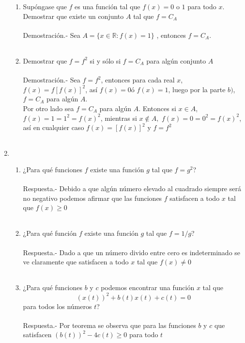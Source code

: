 \begin{enumerate}
\begin{enumerate}[\bfseries (a)]
	    \item Supóngase que $f$ es una función tal que $f(x)=0$ o $1$ para todo $x$. Demostrar que existe un conjunto $A$ tal que $f=C_A$\\\\
	    Demostración.-\; Sea $A=\lbrace x\in \mathbb{R}: f(x)=1\rbrace$ , entonces $f=C_A$.\\\\

	    \item Demostrar que $f=f^2$ si y sólo si $f=C_A$ para algún conjunto $A$\\\\
	    Demostración.-\; Sea $f=f^2$, entonces para cada real $x$, $f(x)=f[f(x)]^2$, así $f(x)=0$ó $f(x)=1$, luego por la parte $b)$, $f=C_A$ para algún $A$.\\
	    Por otro lado sea $f=C_A$ para algún $A$. Entonces si $x\in A$, $f(x)=1=1^2=f(x)^2$, mientras si $x\notin A,$ $f(x)=0=0^2=f(x)^2$, así en cualquier caso $f(x)=[f(x)]^2$ y $f=f^2$\\\\

	\end{enumerate}

	\item 
	\begin{enumerate}[\bfseries (a)]

	    \item ¿Para qué funciones $f$ existe una función $g$ tal que $f=g^2$?\\\\
	    Respuesta.-\; Debido a que algún número elevado al cuadrado siempre será no negativo podemos afirmar que las funciones $f$ satisfacen a todo $x$ tal que $f(x)\geq 0$\\\\

	    \item ¿Para qué función $f$ existe una función $g$ tal que $f=1/g$?\\\\
	    Respuesta.-\; Dado a que un número divido entre cero es indeterminado se ve claramente que satisfacen a todo $x$ tal que $f(x)\neq 0$\\\\

	    \item ¿Para qué funciones $b$ y $c$ podemos encontrar una función $x$ tal que $$(x(t))^2 + b(t)x(t)+c(t)=0$$ para todos los números $t$?\\\\
	    Respuesta.-\; Por teorema se observa que para las funciones $b$ \; y \; $c$ que satisfacen $(b(t))^2 - 4c(t) \geq 0$ para todo $t$\\\\ 


\end{enumerate}
\end{enumerate}
